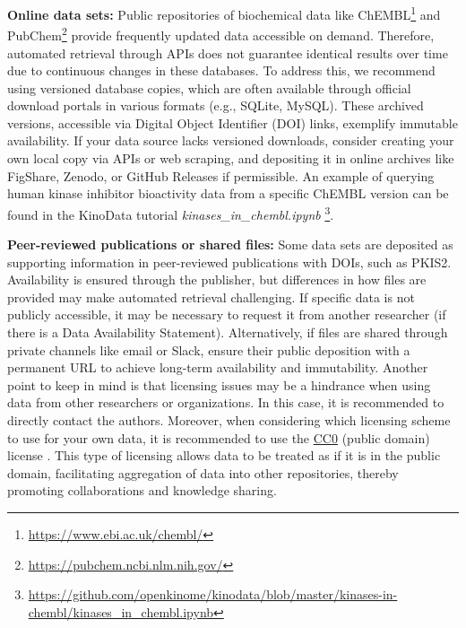 \documentclass[9pt,lessons]{livecoms}
\begin{document}
\textbf{Online data sets:} 
Public repositories of biochemical data like ChEMBL\footnote{\hyperlink{https://www.ebi.ac.uk/chembl/}{https://www.ebi.ac.uk/chembl/}} and PubChem\footnote{\hyperlink{https://pubchem.ncbi.nlm.nih.gov/}{https://pubchem.ncbi.nlm.nih.gov/}} provide frequently updated data accessible on demand. 
Therefore, automated retrieval through APIs does not guarantee identical results over time due to continuous changes in these databases. 
To address this, we recommend using versioned database copies, which are often available through official download portals in various formats (e.g., SQLite, MySQL). 
These archived versions, accessible via Digital Object Identifier (DOI) links, exemplify immutable availability. 
If your data source lacks versioned downloads, consider creating your own local copy via APIs or web scraping, and depositing it in online archives like FigShare, Zenodo, or GitHub Releases if permissible. An example of querying human kinase inhibitor bioactivity data from a specific ChEMBL version can be found in the KinoData tutorial \textit{kinases\_in\_chembl.ipynb} \footnote{\hyperlink{https://github.com/openkinome/kinodata/blob/master/kinases-in-chembl/kinases_in_chembl.ipynb}{https://github.com/openkinome/kinodata/blob/master/kinases-in-chembl/kinases\_in\_chembl.ipynb}}. 

\textbf{Peer-reviewed publications or shared files:} 
Some data sets are deposited as supporting information in peer-reviewed publications with DOIs, such as PKIS2.~\cite{drewry2017progress} 
Availability is ensured through the publisher, but differences in how files are provided may make automated retrieval challenging. 
If specific data is not publicly accessible, it may be necessary to request it from another researcher (if there is a Data Availability Statement). 
Alternatively, if files are shared through private channels like email or Slack, ensure their public deposition with a permanent URL to achieve long-term availability and immutability.  
Another point to keep in mind is that licensing issues may be a hindrance when using data from other researchers or organizations. 
In this case, it is recommended to directly contact the authors. Moreover, when considering which licensing scheme to use for your own data, it is recommended to use the \hyperlink{https://creativecommons.org/public-domain/cc0/}{CC0} (public domain) license \cite{stodden2009enabling}. This type of licensing allows data to be treated as if it is in the public domain, facilitating aggregation of data into other repositories, thereby promoting collaborations and knowledge sharing. 
\end{document}
